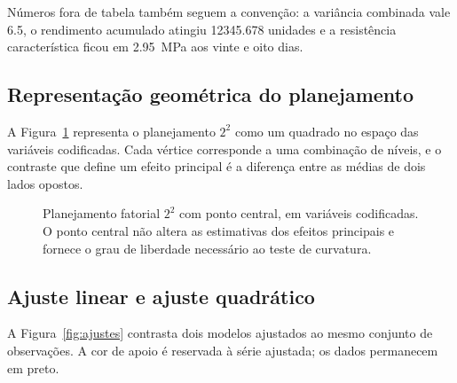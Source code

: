 Números fora de tabela também seguem a convenção: a variância combinada vale
\num{6.5}, o rendimento acumulado atingiu \num{12345.678} unidades e a
resistência característica ficou em \qty{2.95}{\mega\pascal} aos vinte e oito
dias.

\subsection{Representação geométrica do planejamento}

A Figura~\ref{fig:quadrado} representa o planejamento $2^{2}$ como um quadrado
no espaço das variáveis codificadas. Cada vértice corresponde a uma combinação
de níveis, e o contraste que define um efeito principal é a diferença entre as
médias de dois lados opostos.

\begin{figure}[H]
  \centering
  \caption{Planejamento fatorial $2^{2}$ com ponto central, em variáveis
    codificadas. O ponto central não altera as estimativas dos efeitos
    principais e fornece o grau de liberdade necessário ao teste de curvatura.}
  \label{fig:quadrado}
\end{figure}

\subsection{Ajuste linear e ajuste quadrático}

A Figura~\ref{fig:ajustes} contrasta dois modelos ajustados ao mesmo conjunto
de observações. A cor de apoio é reservada à série ajustada; os dados
permanecem em preto.

